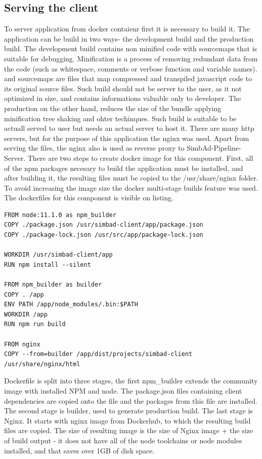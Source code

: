 \subsection{Serving the client}
To server application from docker contaienr first it is necessary to build it. The application can be build in two ways- the development build and the production build. The development build contains non minified code with sourcemaps that is suitable for debugging.  Minification is a process of removing redundant data from the code (such as whitespace, comments or verbose function and variable names). and sourcemaps are files that map compressed and transpiled javascript code to its original source files. Such build should not be server to the user, as it not optimized in size, and contains informations valuable only to developer. The production on the other hand, reduces the size of the bundle applying minification tree shaking and ohter techinques. Such build is suitable to be actuall served to user but needs an actual server to host it. There are many http servers, but for the purpose of this application the nginx was used. Apart from serving the files, the nginx also is used as reverse proxy to SimbAd-Pipeline-Server. 
There are two steps to create docker image for this component. First, all of the npm packages necesary to build the application must be installed, and after building it, the resulting files must be copied to the /usr/share/nginx folder. To avoid increasing the image size the docker multi-stage builds feature was used. The dockerfiles for this component is visible on listing.
\begin{lstlisting}[label=list:sc-docker,caption=Dockerfile used to build SimBaD-Client, basicstyle=\footnotesize\ttfamily]
FROM node:11.1.0 as npm_builder
COPY ./package.json /usr/simbad-client/app/package.json
COPY ./package-lock.json /usr/src/app/package-lock.json

WORKDIR /usr/simbad-client/app
RUN npm install --silent

FROM npm_builder as builder
COPY . /app
ENV PATH /app/node_modules/.bin:$PATH
WORKDIR /app
RUN npm run build

FROM nginx
COPY --from=builder /app/dist/projects/simbad-client /usr/share/nginx/html
\end{lstlisting}
Dockerfile is split into three stages, the first npm\_builder extends the community image with installed NPM and node.
The package.json files containing client dependencies are copied onto the file and the packages from this file are installed. The second stage is builder, used to generate production build. The last stage is Nginx. It starts with nginx image from Dockerhub, to which the resulting build files are copied. The size of resulting image is the size of Nginx image + the size of build output - it does not have all of the node toolchains or node modules installed, and that saves over 1GB of disk space.
